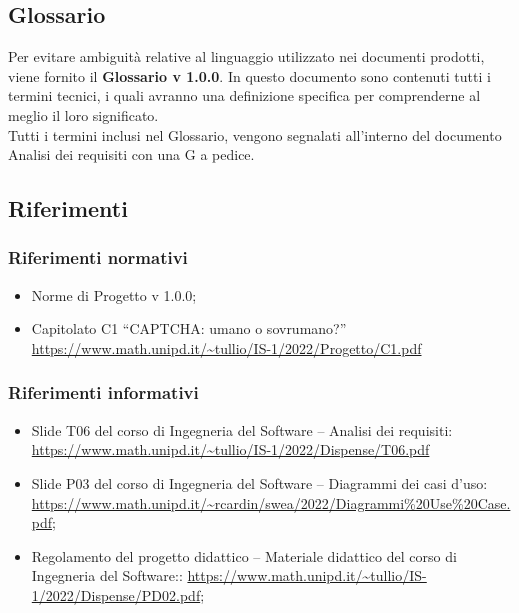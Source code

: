 \subsection{Glossario}
Per evitare ambiguità relative al linguaggio utilizzato nei documenti prodotti, viene fornito il \textbf{Glossario v 1.0.0}. In questo documento sono contenuti tutti i termini tecnici, i quali avranno una definizione specifica per comprenderne al meglio il loro significato.\\
Tutti i termini inclusi nel Glossario, vengono segnalati all'interno del documento Analisi dei requisiti con una G a pedice.

\subsection{Riferimenti}

\subsubsection{Riferimenti normativi}
\begin{itemize}
	\item Norme di Progetto v 1.0.0;
	\item Capitolato C1 “CAPTCHA: umano o sovrumano?”
		\url{https://www.math.unipd.it/~tullio/IS-1/2022/Progetto/C1.pdf}
\end{itemize}

\subsubsection{Riferimenti informativi}

\begin{itemize}
	\item Slide T06 del corso di Ingegneria del Software – Analisi dei requisiti:
		\url{https://www.math.unipd.it/~tullio/IS-1/2022/Dispense/T06.pdf}
	\item Slide P03 del corso di Ingegneria del Software – Diagrammi dei casi d'uso:
		\url{https://www.math.unipd.it/~rcardin/swea/2022/Diagrammi%20Use%20Case.pdf};
	\item Regolamento del progetto didattico – Materiale didattico del corso di Ingegneria del Software::
		\url{https://www.math.unipd.it/~tullio/IS-1/2022/Dispense/PD02.pdf};
\end{itemize}
